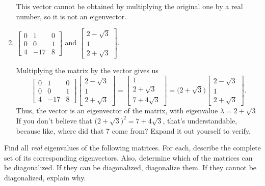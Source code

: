 \documentclass{article}
\begin{document}
\begin{enumerate}
\begin{solution}
\[        \] This vector cannot be obtained by multiplying the original one by a real number, so it is not an eigenvector. 
    \end{solution}
    \item \(\begin{bmatrix}
        0&1&0 \\0&0&1 \\4&-17&8
    \end{bmatrix}\) and \(\begin{bmatrix}
        2-\sqrt{3}\\1\\2+\sqrt{3}
    \end{bmatrix}\).\begin{solution}
        Multiplying the matrix by the vector gives us\[
            \begin{bmatrix}
                0&1&0 \\ 0&0&1 \\ 4&-17&8
            \end{bmatrix} \begin{bmatrix}
                2-\sqrt{3}\\1\\2+\sqrt{3}
            \end{bmatrix} = \begin{bmatrix}
                1\\2+\sqrt{3}\\7+4\sqrt{3}
            \end{bmatrix} = \big(2+\sqrt{3}\big)\begin{bmatrix}
                2-\sqrt{3}\\1\\2+\sqrt{3}
            \end{bmatrix}.  
        \] Thus, the vector is an eigenvector of the matrix, with eigenvalue \(\lambda=2+\sqrt{3}\) If you don't believe that \({\bigl(2+\sqrt{3}\bigr)}^2 = 7 + 4\sqrt{3}\), that's 
        understandable, because like, where did that 7 come from? Expand it out yourself to verify. 
    \end{solution}
\end{enumerate}
\pagebreak
\begin{center}
    \colorbox{CornflowerBlue!50}{
        \begin{minipage}[c]{0.9\textwidth}
            \centering
            Find all \textit{real} eigenvalues of the following matrices. For each, describe the complete set of its corresponding eigenvectors. Also, determine which of the matrices can be diagonalized. 
            If they can be diagonalized, diagonalize them. If they cannot be diagonalized, explain why. 
        \end{minipage}
    }\end{center}
\end{document}
